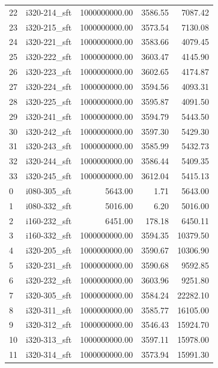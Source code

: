 \begin{tabular}{llrrr}
22 &  i320-214\_sft & 1000000000.00 &           3586.55 &     7087.42 \\
23 &  i320-215\_sft & 1000000000.00 &           3573.54 &     7130.08 \\
24 &  i320-221\_sft & 1000000000.00 &           3583.66 &     4079.45 \\
25 &  i320-222\_sft & 1000000000.00 &           3603.47 &     4145.90 \\
26 &  i320-223\_sft & 1000000000.00 &           3602.65 &     4174.87 \\
27 &  i320-224\_sft & 1000000000.00 &           3594.56 &     4093.31 \\
28 &  i320-225\_sft & 1000000000.00 &           3595.87 &     4091.50 \\
29 &  i320-241\_sft & 1000000000.00 &           3594.79 &     5443.50 \\
30 &  i320-242\_sft & 1000000000.00 &           3597.30 &     5429.30 \\
31 &  i320-243\_sft & 1000000000.00 &           3585.99 &     5432.73 \\
32 &  i320-244\_sft & 1000000000.00 &           3586.44 &     5409.35 \\
33 &  i320-245\_sft & 1000000000.00 &           3612.04 &     5415.13 \\
0  &  i080-305\_sft &       5643.00 &              1.71 &     5643.00 \\
1  &  i080-332\_sft &       5016.00 &              6.20 &     5016.00 \\
2  &  i160-232\_sft &       6451.00 &            178.18 &     6450.11 \\
3  &  i160-332\_sft & 1000000000.00 &           3594.35 &    10379.50 \\
4  &  i320-205\_sft & 1000000000.00 &           3590.67 &    10306.90 \\
5  &  i320-231\_sft & 1000000000.00 &           3590.68 &     9592.85 \\
6  &  i320-232\_sft & 1000000000.00 &           3603.96 &     9251.80 \\
7  &  i320-305\_sft & 1000000000.00 &           3584.24 &    22282.10 \\
8  &  i320-311\_sft & 1000000000.00 &           3585.77 &    16105.00 \\
9  &  i320-312\_sft & 1000000000.00 &           3546.43 &    15924.70 \\
10 &  i320-313\_sft & 1000000000.00 &           3597.11 &    15978.00 \\
11 &  i320-314\_sft & 1000000000.00 &           3573.94 &    15991.30 \\

\end{tabular}
